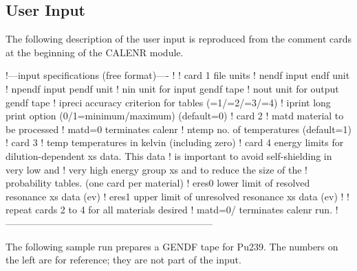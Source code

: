 \subsection{User Input}
\label{ssCALENR_UserInp}

The following description of the user input is reproduced from
the comment cards at the beginning of the CALENR module.

\small
\begin{ccode}
   !---input specifications (free format)----
   !
   ! card 1 file units
   !   nendf   input endf unit
   !   npendf  input pendf unit
   !   nin     unit for input gendf tape
   !   nout    unit for output gendf tape
   !   ipreci  accuracy criterion for tables (=1/=2/=3/=4)
   !   iprint  long print option (0/1=minimum/maximum) (default=0)
   ! card 2
   !   matd    material to be processed
   !           matd=0 terminates calenr
   !   ntemp   no. of temperatures (default=1)
   ! card 3
   !   temp    temperatures in kelvin (including zero)
   ! card 4 energy limits for dilution-dependent xs data. This data
   !        is important to avoid self-shielding in very low and
   !        very high energy group xs and to reduce the size of the
   !        probability tables. (one card per material)
   !   eres0     lower limit of resolved resonance xs data (ev)
   !   eres1     upper limit of unresolved resonance xs data (ev)
   !
   !            repeat cards 2 to 4 for all materials desired
   !            matd=0/ terminates calenr run.
   !-----------------------------------------------------------------

\end{ccode}
\normalsize

The following sample run prepares a GENDF tape for Pu239.
The numbers on the left are for reference; they are not part of the input.


